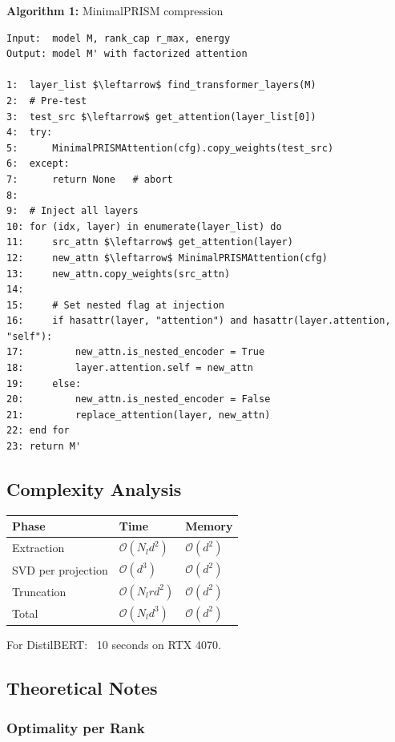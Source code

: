 \textbf{Algorithm 1:} MinimalPRISM compression
\begin{lstlisting}
Input:  model M, rank_cap r_max, energy  
Output: model M' with factorized attention

1:  layer_list $\leftarrow$ find_transformer_layers(M)
2:  # Pre-test
3:  test_src $\leftarrow$ get_attention(layer_list[0])
4:  try:
5:      MinimalPRISMAttention(cfg).copy_weights(test_src)
6:  except:
7:      return None   # abort
8:
9:  # Inject all layers
10: for (idx, layer) in enumerate(layer_list) do
11:     src_attn $\leftarrow$ get_attention(layer)
12:     new_attn $\leftarrow$ MinimalPRISMAttention(cfg)
13:     new_attn.copy_weights(src_attn)
14:
15:     # Set nested flag at injection
16:     if hasattr(layer, "attention") and hasattr(layer.attention, "self"):
17:         new_attn.is_nested_encoder = True
18:         layer.attention.self = new_attn
19:     else:
20:         new_attn.is_nested_encoder = False
21:         replace_attention(layer, new_attn)
22: end for
23: return M'
\end{lstlisting}

\subsection{Complexity Analysis}

\begin{table}[H]
\centering
\small
\begin{tabular}{lll}
\toprule
\textbf{Phase} & \textbf{Time} & \textbf{Memory} \\
\midrule
Extraction & $\mathcal{O}(N_l d^2)$ & $\mathcal{O}(d^2)$ \\
SVD per projection & $\mathcal{O}(d^3)$ & $\mathcal{O}(d^2)$ \\
Truncation & $\mathcal{O}(N_l r d^2)$ & $\mathcal{O}(d^2)$ \\
Total & $\mathcal{O}(N_l d^3)$ & $\mathcal{O}(d^2)$ \\
\bottomrule
\end{tabular}
\end{table}

For DistilBERT: ~10 seconds on RTX 4070.

\subsection{Theoretical Notes}

\subsubsection{Optimality per Rank}

